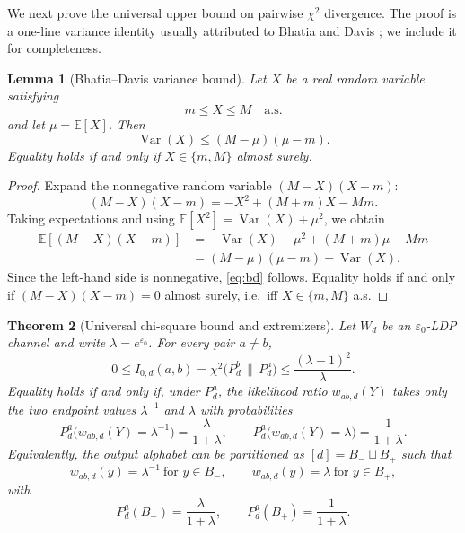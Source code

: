 \documentclass[11pt]{amsart}
\numberwithin{equation}{section}
\newtheorem{theorem}{Theorem}[section]
\newtheorem{lemma}[theorem]{Lemma}
\theoremstyle{definition}
\newcommand{\E}{\mathbb E}
\DeclareMathOperator{\Var}{Var}
\begin{document}
We next prove the universal upper bound on pairwise $\chi^2$ divergence.
The proof is a one-line variance identity usually attributed to Bhatia and Davis
\cite{BhatiaDavis2000}; we include it for completeness.

\begin{lemma}[Bhatia--Davis variance bound]\label{lem:bhatia-davis}
Let $X$ be a real random variable satisfying
\[
m \le X \le M \quad \text{a.s.}
\]
and let $\mu=\E[X]$.
Then
\[
\Var(X)\le (M-\mu)(\mu-m). \tag{4.1}\label{eq:bd}
\]
Equality holds if and only if $X\in\{m,M\}$ almost surely.
\end{lemma}

\begin{proof}
Expand the nonnegative random variable $(M-X)(X-m)$:
\[
(M-X)(X-m)= -X^2 +(M+m)X - Mm.
\]
Taking expectations and using
\(
\E[X^2]=\Var(X)+\mu^2
\),
we obtain
\[
\begin{aligned}
\E[(M-X)(X-m)]
&=
-\Var(X)-\mu^2 +(M+m)\mu - Mm\\
&=
(M-\mu)(\mu-m)-\Var(X).
\end{aligned}
\]
Since the left-hand side is nonnegative, \eqref{eq:bd} follows.
Equality holds if and only if $(M-X)(X-m)=0$ almost surely, i.e.\ iff
$X\in\{m,M\}$ a.s.
\end{proof}

\begin{theorem}[Universal chi-square bound and extremizers]\label{thm:chi2-bound}
Let $W_d$ be an $\varepsilon_0$-LDP channel and write $\lambda=e^{\varepsilon_0}$.
For every pair $a\neq b$,
\[
0 \le I_{0,d}(a,b)
=
\chi^2\!\bigl(P_d^b\,\|\,P_d^a\bigr)
\le \frac{(\lambda-1)^2}{\lambda}. \tag{4.2}\label{eq:chi-bound}
\]
Equality holds if and only if, under $P_d^a$, the likelihood ratio
$w_{ab,d}(Y)$ takes only the two endpoint values
$\lambda^{-1}$ and $\lambda$ with probabilities
\[
P_d^a\!\bigl(w_{ab,d}(Y)=\lambda^{-1}\bigr)=\frac{\lambda}{1+\lambda},
\qquad
P_d^a\!\bigl(w_{ab,d}(Y)=\lambda\bigr)=\frac{1}{1+\lambda}. \tag{4.3}\label{eq:endpoint-masses}
\]
Equivalently, the output alphabet can be partitioned as
\(
[d]=B_-\sqcup B_+
\)
such that
\[
w_{ab,d}(y)=\lambda^{-1}\ \text{for } y\in B_-,
\qquad
w_{ab,d}(y)=\lambda\ \text{for } y\in B_+,
\]
with
\[
P_d^a(B_-)=\frac{\lambda}{1+\lambda},
\qquad
P_d^a(B_+)=\frac{1}{1+\lambda}. \tag{4.4}\label{eq:block-masses}
\]
\end{theorem}
\end{document}
